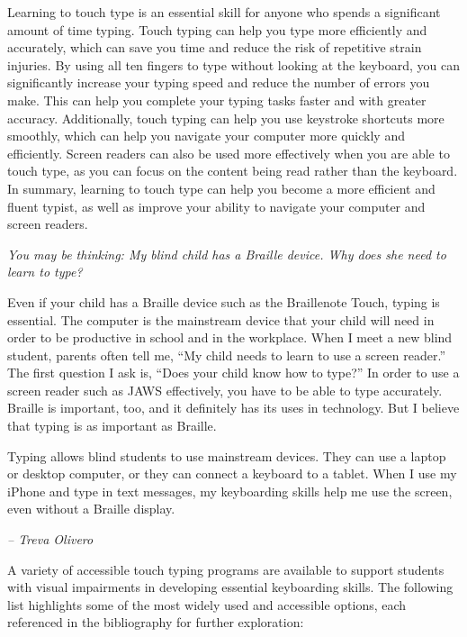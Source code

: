 Learning to touch type is an essential skill for anyone who spends a significant amount of time typing. Touch typing can help you type more efficiently and accurately, which can save you time and reduce the risk of repetitive strain injuries. By using all ten fingers to type without looking at the keyboard, you can significantly increase your typing speed and reduce the number of errors you make. This can help you complete your typing tasks faster and with greater accuracy. Additionally, touch typing can help you use keystroke shortcuts more smoothly, which can help you navigate your computer more quickly and efficiently. Screen readers can also be used more effectively when you are able to touch type, as you can focus on the content being read rather than the keyboard. In summary, learning to touch type can help you become a more efficient and fluent typist, as well as improve your ability to navigate your computer and screen readers.

\emph{You may be thinking: My blind child has a Braille device. Why does she need to learn to type?}

Even if your child has a Braille device such as the Braillenote Touch, typing is essential. The computer is the mainstream device that your child will need in order to be productive in school and in the workplace. When I meet a new blind student, parents often tell me, ``My child needs to learn to use a screen reader.'' The first question I ask is, ``Does your child know how to type?'' In order to use a screen reader such as JAWS effectively, you have to be able to type accurately. Braille is important, too, and it definitely has its uses in technology. But I believe that typing is as important as Braille.

Typing allows blind students to use mainstream devices. They can use a laptop or desktop computer, or they can connect a keyboard to a tablet. When I use my iPhone and type in text messages, my keyboarding skills help me use the screen, even without a Braille display.

\emph{-- Treva Olivero}  \cite{Olivero1997}

A variety of accessible touch typing programs are available to support students with visual impairments in developing essential keyboarding skills. The following list highlights some of the most widely used and accessible options, each referenced in the bibliography for further exploration:

